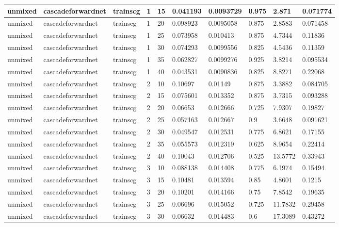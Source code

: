 \begin{longtable}{lllllllll}
unmixed & cascadeforwardnet & trainscg & 1 & 15 & 0.041193 & 0.0093729 & 0.975 & 2.871 & 0.071774 \\ \hline 
unmixed & cascadeforwardnet & trainscg & 1 & 20 & 0.098923 & 0.0095058 & 0.875 & 2.8583 & 0.071458 \\ \hline 
unmixed & cascadeforwardnet & trainscg & 1 & 25 & 0.073958 & 0.010413 & 0.875 & 4.7344 & 0.11836 \\ \hline 
unmixed & cascadeforwardnet & trainscg & 1 & 30 & 0.074293 & 0.0099556 & 0.825 & 4.5436 & 0.11359 \\ \hline 
unmixed & cascadeforwardnet & trainscg & 1 & 35 & 0.062827 & 0.0099276 & 0.925 & 3.8214 & 0.095534 \\ \hline 
unmixed & cascadeforwardnet & trainscg & 1 & 40 & 0.043531 & 0.0090836 & 0.825 & 8.8271 & 0.22068 \\ \hline 
unmixed & cascadeforwardnet & trainscg & 2 & 10 & 0.10697 & 0.01149 & 0.875 & 3.3882 & 0.084705 \\ \hline 
unmixed & cascadeforwardnet & trainscg & 2 & 15 & 0.075601 & 0.013352 & 0.875 & 3.7315 & 0.093288 \\ \hline 
unmixed & cascadeforwardnet & trainscg & 2 & 20 & 0.06653 & 0.012666 & 0.725 & 7.9307 & 0.19827 \\ \hline 
unmixed & cascadeforwardnet & trainscg & 2 & 25 & 0.057163 & 0.012667 & 0.9 & 3.6648 & 0.091621 \\ \hline 
unmixed & cascadeforwardnet & trainscg & 2 & 30 & 0.049547 & 0.012531 & 0.775 & 6.8621 & 0.17155 \\ \hline 
unmixed & cascadeforwardnet & trainscg & 2 & 35 & 0.055573 & 0.012319 & 0.625 & 8.9654 & 0.22414 \\ \hline 
unmixed & cascadeforwardnet & trainscg & 2 & 40 & 0.10043 & 0.012706 & 0.525 & 13.5772 & 0.33943 \\ \hline 
unmixed & cascadeforwardnet & trainscg & 3 & 10 & 0.088138 & 0.014408 & 0.775 & 6.1974 & 0.15494 \\ \hline 
unmixed & cascadeforwardnet & trainscg & 3 & 15 & 0.10481 & 0.013594 & 0.85 & 4.8601 & 0.1215 \\ \hline 
unmixed & cascadeforwardnet & trainscg & 3 & 20 & 0.10201 & 0.014166 & 0.75 & 7.8542 & 0.19635 \\ \hline 
unmixed & cascadeforwardnet & trainscg & 3 & 25 & 0.06696 & 0.015052 & 0.725 & 11.7832 & 0.29458 \\ \hline 
unmixed & cascadeforwardnet & trainscg & 3 & 30 & 0.06632 & 0.014483 & 0.6 & 17.3089 & 0.43272 \\ \hline 

\end{longtable}
